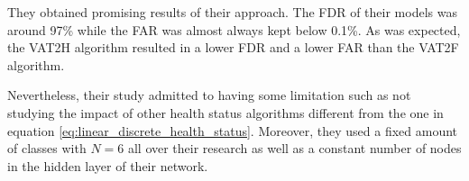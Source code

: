 They obtained promising results of their approach.
The FDR of their models was around 97\% while the FAR was almost always kept below 0.1\%.
As was expected, the VAT2H algorithm resulted in a lower FDR and a lower FAR than the VAT2F algorithm.

Nevertheless, their study admitted to having some limitation such as not studying the impact of other health status algorithms different from the one in equation \ref{eq:linear_discrete_health_status}.
Moreover, they used a fixed amount of classes with $N=6$ all over their research as well as a constant number of nodes in the hidden layer of their network.
